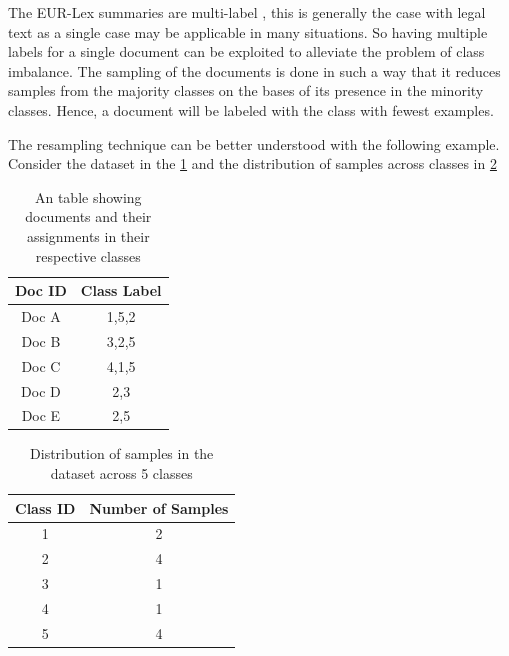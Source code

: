 The EUR-Lex summaries are multi-label , this is generally the case with legal text as a single case may be applicable in many situations. So having multiple labels for a single document can be exploited to alleviate the problem of class imbalance. The sampling of the documents is done in such a way that it reduces samples from the majority classes on the bases of its presence in the minority classes. Hence, a document will be labeled with the class with fewest examples. 

The resampling technique can be better understood with the following example. Consider the dataset in the \ref{table:exampleDataResampling} and the distribution of samples across classes in \ref{table:SamplesDistributionDataResamplingExample}

\begin{table}[!ht]
\centering
\begin{tabular}{cc}

\hline
\textbf{Doc ID} & \textbf{Class Label} \\ \hline
Doc A           & 1,5,2                \\ 
Doc B           & 3,2,5                    \\ 
Doc C           & 4,1,5                  \\ 
Doc D           & 2,3                    \\ 
Doc E           & 2,5                  \\ \hline
\end{tabular}
\captionsetup{justification=centering,margin=2cm}
\caption{An table showing documents and their assignments in their respective classes}
\label{table:exampleDataResampling}
\end{table}

\begin{table}[!ht]
\centering
\begin{tabular}{cc}
\hline
\textbf{Class ID} & \textbf{Number of Samples} \\ \hline
1                 & 2                         \\ 
2                 & 4                          \\ 
3                 & 1                          \\ 
4                 & 1                          \\ 
5                 & 4                         \\ \hline
\end{tabular}
\captionsetup{justification=centering,margin=2cm}
\caption{Distribution of samples in the dataset across 5 classes}
\label{table:SamplesDistributionDataResamplingExample}
\end{table}

